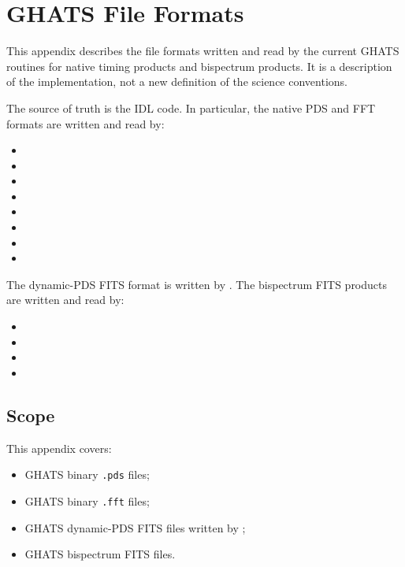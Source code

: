 \chapter{GHATS File Formats}
\label{app:file-formats}

This appendix describes the file formats written and read by the current GHATS
routines for native timing products and bispectrum products.  It is a
description of the implementation, not a new definition of the science
conventions.

The source of truth is the IDL code.  In particular, the native PDS and FFT
formats are written and read by:

\begin{itemize}
\item {}
\item {}
\item {}
\item {}
\item {}
\item {}
\item {}
\item {}
\end{itemize}

The dynamic-PDS FITS format is written by .  The
bispectrum FITS products are written and read by:

\begin{itemize}
\item {}
\item {}
\item {}
\item {}
\end{itemize}

\section{Scope}

This appendix covers:

\begin{itemize}
\item GHATS binary \texttt{.pds} files;
\item GHATS binary \texttt{.fft} files;
\item GHATS dynamic-PDS FITS files written by ;
\item GHATS bispectrum FITS files.
\end{itemize}

